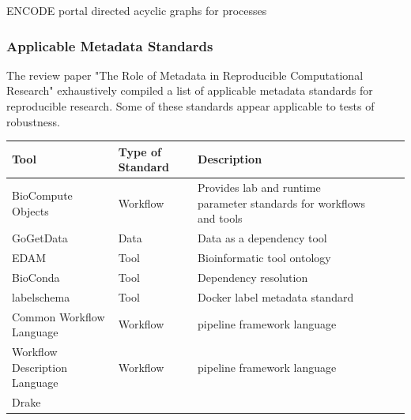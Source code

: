 \documentclass{drexelthesis}
\begin{document}
ENCODE portal directed acyclic graphs for processes

\subsubsection{Applicable Metadata Standards}

The review paper "The Role of Metadata in Reproducible Computational Research" exhaustively compiled a list of applicable metadata standards for reproducible research. Some of these standards appear applicable to tests of robustness. 

\begin{table}[H]
\begin{adjustbox}{max width=\textwidth}
\begin{tabular}{p{4.07cm}p{2.67cm}p{9.82cm}p{4.07cm}p{2.67cm}p{9.82cm}}
\hline
\multicolumn{1}{|p{4.07cm}}{Tool} & 
\multicolumn{1}{|p{2.67cm}}{Type of Standard} & 
\multicolumn{1}{|p{9.82cm}|}{Description} \\ 
\hline
\multicolumn{1}{|p{4.07cm}}{BioCompute Objects\cite{Simonyan2017-st}} & 
\multicolumn{1}{|p{2.67cm}}{Workflow } & 
\multicolumn{1}{|p{9.82cm}|}{Provides lab and runtime parameter standards for workflows and tools} \\ 
\hline
\multicolumn{1}{|p{4.07cm}}{GoGetData} & 
\multicolumn{1}{|p{2.67cm}}{Data} & 
\multicolumn{1}{|p{9.82cm}|}{Data as a dependency tool} \\ 
\hline
\multicolumn{1}{|p{4.07cm}}{EDAM\cite{Ison2013-gm}} & 
\multicolumn{1}{|p{2.67cm}}{Tool} & 
\multicolumn{1}{|p{9.82cm}|}{Bioinformatic tool ontology} \\ 
\hline
\multicolumn{1}{|p{4.07cm}}{BioConda\cite{Dale2017-aj}} & 
\multicolumn{1}{|p{2.67cm}}{Tool} & 
\multicolumn{1}{|p{9.82cm}|}{Dependency resolution} \\ 
\hline
\multicolumn{1}{|p{4.07cm}}{labelschema} & 
\multicolumn{1}{|p{2.67cm}}{Tool} & 
\multicolumn{1}{|p{9.82cm}|}{Docker label metadata standard} \\ 
\hline
\multicolumn{1}{|p{4.07cm}}{Common Workflow Language\cite{Peter2016-vi}} & 
\multicolumn{1}{|p{2.67cm}}{Workflow } & 
\multicolumn{1}{|p{9.82cm}|}{pipeline framework language } \\ 
\hline
\multicolumn{1}{|p{4.07cm}}{Workflow Description Language\cite{Voss2017-ro}} & 
\multicolumn{1}{|p{2.67cm}}{Workflow } & 
\multicolumn{1}{|p{9.82cm}|}{pipeline framework language} \\ 
\hline
\multicolumn{1}{|p{4.07cm}}{Drake\cite{Landau_undated-yt}} & 

\end{tabular}
\end{adjustbox}
\end{table}
\end{document}
